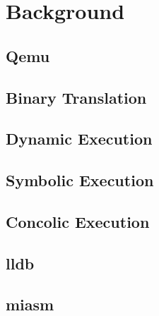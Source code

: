 
\chapter{Background}\label{chapter:background}



\section{Qemu}
\section{Binary Translation}
\section{Dynamic Execution}
\section{Symbolic Execution}
\section{Concolic Execution}
\section{lldb}
\section{miasm}
